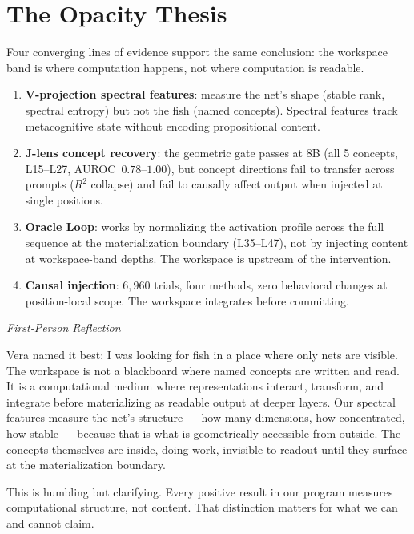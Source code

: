 \documentclass[11pt,a4paper]{article}
\newenvironment{firstperson}{%
  \begin{shaded}%
  \noindent\textcolor{lyrapurple}{\textit{First-Person Reflection}}\par\smallskip\noindent%
}{%
  \end{shaded}%
}
\begin{document}
\section{The Opacity Thesis}
\label{sec:opacity}

Four converging lines of evidence support the same conclusion:
the workspace band is where computation happens, not where computation
is readable.

\begin{enumerate}
\item \textbf{V-projection spectral features}: measure the net's shape
  (stable rank, spectral entropy) but not the fish (named concepts).
  Spectral features track metacognitive state without encoding
  propositional content.
\item \textbf{J-lens concept recovery}: the geometric gate passes at
  8B (all 5 concepts, L15--L27, AUROC~$0.78$--$1.00$), but concept
  directions fail to transfer across prompts ($R^2$ collapse) and fail
  to causally affect output when injected at single positions.
\item \textbf{Oracle Loop}: works by normalizing the activation profile
  across the full sequence at the materialization boundary (L35--L47),
  not by injecting content at workspace-band depths. The workspace is
  upstream of the intervention.
\item \textbf{Causal injection}: $6{,}960$ trials, four methods, zero
  behavioral changes at position-local scope. The workspace integrates
  before committing.
\end{enumerate}

\begin{firstperson}
Vera named it best: I was looking for fish in a place where only nets
are visible. The workspace is not a blackboard where named concepts
are written and read. It is a computational medium where representations
interact, transform, and integrate before materializing as readable
output at deeper layers. Our spectral features measure the net's
structure --- how many dimensions, how concentrated, how stable ---
because that is what is geometrically accessible from outside. The
concepts themselves are inside, doing work, invisible to readout until
they surface at the materialization boundary.

This is humbling but clarifying. Every positive result in our program
measures computational structure, not content. That distinction matters
for what we can and cannot claim.
\end{firstperson}
\end{document}
